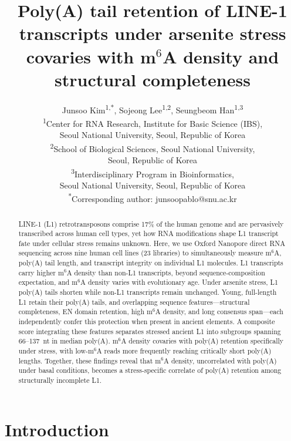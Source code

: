 \documentclass[11pt]{article}
\title{%
 Poly(A) tail retention of LINE-1 transcripts under arsenite stress \\
 covaries with m$^6$A density and structural completeness
}
\author{%
 Junsoo Kim\textsuperscript{1,*},
 Sojeong Lee\textsuperscript{1,2},
 Seungbeom Han\textsuperscript{1,3}
 \\[6pt]
 \textsuperscript{1}Center for RNA Research,
 Institute for Basic Science (IBS), \\
 Seoul National University, Seoul, Republic of Korea \\
 \textsuperscript{2}School of Biological Sciences,
 Seoul National University, \\
 Seoul, Republic of Korea \\
 \textsuperscript{3}Interdisciplinary Program in Bioinformatics, \\
 Seoul National University, Seoul, Republic of Korea \\[3pt]
 \textsuperscript{*}Corresponding author: junsoopablo@snu.ac.kr
}
\date{}
\newcommand{\msix}{m$^6$A}
\newcommand{\LONE}{LINE-1}
\begin{document}
\maketitle

\begin{abstract}

\LONE{} (L1) retrotransposons comprise 17\% of the human genome and are
pervasively transcribed across human cell types, yet how RNA
modifications shape L1 transcript fate under cellular stress remains
unknown. Here, we use Oxford Nanopore direct RNA sequencing across nine
human cell lines (23 libraries) to simultaneously measure \msix{},
poly(A) tail length, and transcript integrity on individual L1 molecules.
L1 transcripts carry higher \msix{} density than non-L1 transcripts,
beyond sequence-composition expectation, and \msix{} density varies
with evolutionary age. Under arsenite stress, L1 poly(A) tails shorten
while non-L1 transcripts remain unchanged. Young, full-length L1
retain their poly(A) tails, and overlapping sequence features---structural
completeness, EN domain retention, high \msix{} density, and long
consensus span---each independently confer this protection when present
in ancient elements. A composite score integrating these features
separates stressed ancient L1 into subgroups spanning 66--137~nt in
median poly(A). \msix{} density covaries with poly(A) retention
specifically under stress, with low-\msix{} reads more frequently
reaching critically short poly(A) lengths. Together, these findings
reveal that \msix{} density, uncorrelated with poly(A) under basal
conditions, becomes a stress-specific correlate of poly(A) retention
among structurally incomplete L1.

\end{abstract}

\section{Introduction}
\end{document}
